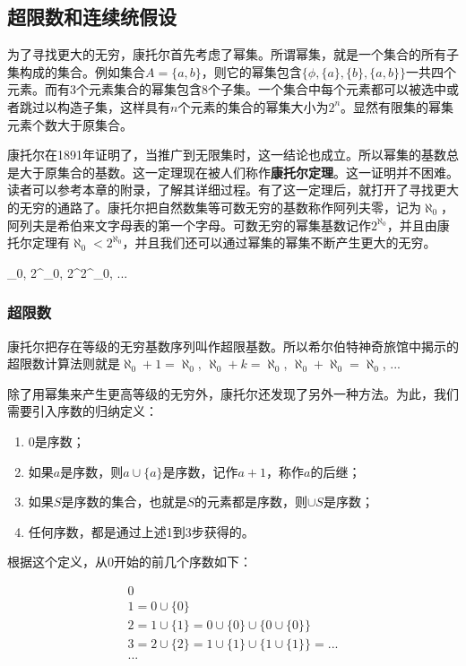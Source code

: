 \documentclass{article}
\begin{document}
\subsection{超限数和连续统假设}
为了寻找更大的无穷，康托尔首先考虑了幂集。所谓幂集，就是一个集合的所有子集构成的集合。例如集合$A = \{a, b\}$，则它的幂集包含$\{\phi, \{a\}, \{b\}, \{a, b\}\}$一共四个元素。而有3个元素集合的幂集包含8个子集。一个集合中每个元素都可以被选中或者跳过以构造子集，这样具有$n$个元素的集合的幂集大小为$2^n$。显然有限集的幂集元素个数大于原集合。

康托尔在1891年证明了，当推广到无限集时，这一结论也成立。所以幂集的基数总是大于原集合的基数。这一定理现在被人们称作\textbf{康托尔定理}。这一证明并不困难。读者可以参考本章的附录，了解其详细过程。有了这一定理后，就打开了寻找更大的无穷的通路了。康托尔把自然数集等可数无穷的基数称作阿列夫零，记为$\aleph_0$，阿列夫是希伯来文字母表的第一个字母。可数无穷的幂集基数记作$2^{\aleph_0}$，并且由康托尔定理有$\aleph_0 < 2^{\aleph_0}$，并且我们还可以通过幂集的幂集不断产生更大的无穷。

\be
\aleph_0, 2^{\aleph_0}, 2^{2^{\aleph_0}}, ...
\ee

\subsubsection{超限数}
康托尔把存在等级的无穷基数序列叫作超限基数。所以希尔伯特神奇旅馆中揭示的超限数计算法则就是$\aleph_0 + 1 = \aleph_0$, $\aleph_0 + k = \aleph_0 $, $\aleph_0 + \aleph_0 = \aleph_0$, ...

除了用幂集来产生更高等级的无穷外，康托尔还发现了另外一种方法。为此，我们需要引入序数的归纳定义：

\begin{enumerate}
\item 0是序数；
\item 如果$a$是序数，则$a \cup \{a\}$是序数，记作$a + 1$，称作$a$的后继；
\item 如果$S$是序数的集合，也就是$S$的元素都是序数，则$\cup S$是序数；
\item 任何序数，都是通过上述1到3步获得的。
\end{enumerate}

根据这个定义，从0开始的前几个序数如下：

\[
\begin{array}{l}
0 \\
1 = 0 \cup \{0\} \\
2 = 1 \cup \{1\} = 0 \cup \{0\} \cup \{0 \cup \{0\}\} \\
3 = 2 \cup \{2\} = 1 \cup \{1\} \cup \{1 \cup \{1\}\} = ... \\
... \\
\end{array}
\]
\end{document}
